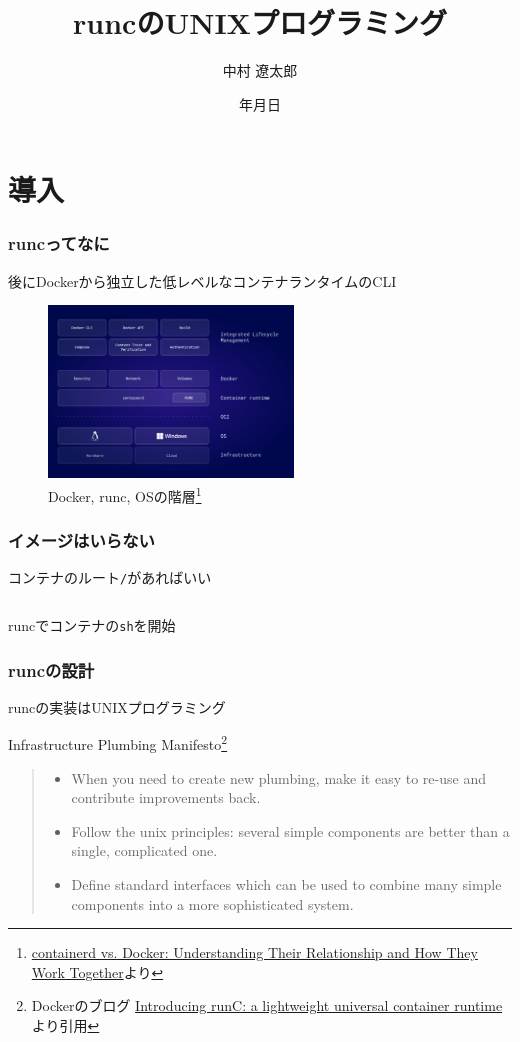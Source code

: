 \documentclass[unicode, 14pt, aspectratio=169]{beamer}
\date{\number\year 年\number\month 月\number\day 日}
\title{runcのUNIXプログラミング}
\author{中村 遼太郎}
\begin{document}
\begin{frame}
\titlepage
\end{frame}
\section{導入}
\begin{frame}[t]
  \frametitle{runcってなに}
  後にDockerから独立した低レベルなコンテナランタイムのCLI
  \begin{figure}
    \centering
    \includegraphics[width=6.5cm]{images/containerd-diagram-v1.png}
    \caption{Docker, runc, OSの階層\footnote{\scriptsize{\href{https://www.docker.com/blog/containerd-vs-docker}{containerd vs. Docker: Understanding Their Relationship and How They Work Together}より}}}
    \label{fig:runc}
  \end{figure}
\end{frame}
\begin{frame}[fragile=singleslide]
  \frametitle{イメージはいらない}
  コンテナのルート\texttt{/}があればいい
  \begin{center}
    \inputminted[fontsize=\footnotesize]{sh}{code/run.sh}
    runcでコンテナの\texttt{sh}を開始\supercite{runc}  
  \end{center}
\end{frame}
\begin{frame}[t]
  \frametitle{runcの設計}
  runcの実装はUNIXプログラミング
  \begin{center}
    Infrastructure Plumbing Manifesto\footnote{\scriptsize{Dockerのブログ \href{https://www.docker.com/blog/runc/}{Introducing runC: a lightweight universal container runtime
}より引用}}
    \end{center}
  \begin{quote}
    \begin{itemize}
    \item {\small When you need to create new plumbing, make it easy to re-use and contribute improvements back.}
    \item {\small Follow the unix principles: several simple components are better than a single, complicated one.}
    \item {\small Define standard interfaces which can be used to combine many simple components into a more sophisticated system.}
  \end{itemize}
  \end{quote}
\end{frame}
\end{document}
